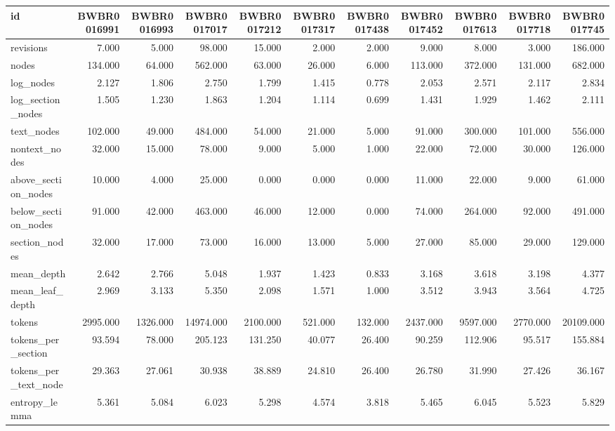 \begin{tabular}{lrrrrrrrrrr}
\toprule
id & BWBR0016991 & BWBR0016993 & BWBR0017017 & BWBR0017212 & BWBR0017317 & BWBR0017438 & BWBR0017452 & BWBR0017613 & BWBR0017718 & BWBR0017745 \\
\midrule
revisions & 7.000 & 5.000 & 98.000 & 15.000 & 2.000 & 2.000 & 9.000 & 8.000 & 3.000 & 186.000 \\
\cline{1-11}
nodes & 134.000 & 64.000 & 562.000 & 63.000 & 26.000 & 6.000 & 113.000 & 372.000 & 131.000 & 682.000 \\
\cline{1-11}
log\_nodes & 2.127 & 1.806 & 2.750 & 1.799 & 1.415 & 0.778 & 2.053 & 2.571 & 2.117 & 2.834 \\
\cline{1-11}
log\_section\_nodes & 1.505 & 1.230 & 1.863 & 1.204 & 1.114 & 0.699 & 1.431 & 1.929 & 1.462 & 2.111 \\
\cline{1-11}
text\_nodes & 102.000 & 49.000 & 484.000 & 54.000 & 21.000 & 5.000 & 91.000 & 300.000 & 101.000 & 556.000 \\
\cline{1-11}
nontext\_nodes & 32.000 & 15.000 & 78.000 & 9.000 & 5.000 & 1.000 & 22.000 & 72.000 & 30.000 & 126.000 \\
\cline{1-11}
above\_section\_nodes & 10.000 & 4.000 & 25.000 & 0.000 & 0.000 & 0.000 & 11.000 & 22.000 & 9.000 & 61.000 \\
\cline{1-11}
below\_section\_nodes & 91.000 & 42.000 & 463.000 & 46.000 & 12.000 & 0.000 & 74.000 & 264.000 & 92.000 & 491.000 \\
\cline{1-11}
section\_nodes & 32.000 & 17.000 & 73.000 & 16.000 & 13.000 & 5.000 & 27.000 & 85.000 & 29.000 & 129.000 \\
\cline{1-11}
mean\_depth & 2.642 & 2.766 & 5.048 & 1.937 & 1.423 & 0.833 & 3.168 & 3.618 & 3.198 & 4.377 \\
\cline{1-11}
mean\_leaf\_depth & 2.969 & 3.133 & 5.350 & 2.098 & 1.571 & 1.000 & 3.512 & 3.943 & 3.564 & 4.725 \\
\cline{1-11}
tokens & 2995.000 & 1326.000 & 14974.000 & 2100.000 & 521.000 & 132.000 & 2437.000 & 9597.000 & 2770.000 & 20109.000 \\
\cline{1-11}
tokens\_per\_section & 93.594 & 78.000 & 205.123 & 131.250 & 40.077 & 26.400 & 90.259 & 112.906 & 95.517 & 155.884 \\
\cline{1-11}
tokens\_per\_text\_node & 29.363 & 27.061 & 30.938 & 38.889 & 24.810 & 26.400 & 26.780 & 31.990 & 27.426 & 36.167 \\
\cline{1-11}
entropy\_lemma & 5.361 & 5.084 & 6.023 & 5.298 & 4.574 & 3.818 & 5.465 & 6.045 & 5.523 & 5.829 \\

\end{tabular}
